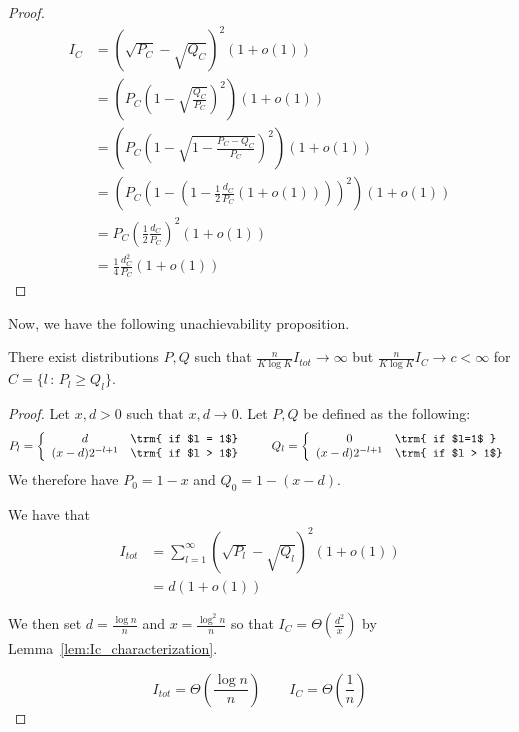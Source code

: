 \documentclass{article}
\begin{document}
\begin{proof}

\begin{align*}
I_C &= (\sqrt{P_C} - \sqrt{Q_C} )^2 (1 + o(1)) \\
 &= \left( P_C (1 - \sqrt{\frac{Q_C}{P_C}})^2  \right) (1 + o(1)) \\
&= \left( P_C \left( 1 - \sqrt{ 1 - \frac{P_C - Q_C}{P_C}}\right)^2 
         \right) (1+o(1)) \\
&= \left( 
    P_C \left( 1 - (1 - \frac{1}{2} \frac{d_C}{P_C} (1+o(1)) ) \right)^2 
    \right) (1+o(1)) \\
&= P_C \left( \frac{1}{2} \frac{d_C}{P_C} \right)^2 (1 + o(1)) \\
&= \frac{1}{4} \frac{d_C^2}{P_C} (1 + o(1)) 
\end{align*}

\end{proof}

Now, we have the following unachievability proposition.
\begin{proposition}
There exist distributions $P,Q$ such that $\frac{n}{K \log K} I_{tot} \rightarrow \infty$ but $\frac{n}{K \log K} I_C \rightarrow c < \infty$ for $C = \{ l \,:\, P_l \geq Q_l \}$.
\end{proposition}

\begin{proof} Let $x, d > 0$ such that $x, d \rightarrow 0$. 
Let $P, Q$ be defined as the following:
\begin{align*}
P_l = \left\{ \begin{array}{cl} 
  d & \trm{ if $l = 1$} \\
  (x - d) 2^{-l+1} & \trm{ if $l > 1$} 
 \end{array} \right. 
\qquad
Q_l = \left\{ \begin{array}{cl} 
  0 & \trm{ if $l=1$ } \\
  (x - d) 2^{-l+1} & \trm{ if $l > 1$} 
\end{array} \right.
\end{align*}
We therefore have $P_0 = 1 - x$ and $Q_0 = 1 - (x - d)$. 

We have that
\begin{align*} 
I_{tot} &= \sum_{l=1}^\infty (\sqrt{P_l} - \sqrt{Q_l})^2 (1 + o(1)) \\
 &= d (1 + o(1)) 
\end{align*}

We then set $d = \frac{\log n}{n}$ and $x = \frac{\log^2 n}{n}$ so that $I_C = \Theta( \frac{ d^2}{x})$ by Lemma~\ref{lem:Ic_characterization}.

\[
I_{tot} = \Theta \left( \frac{\log n}{n} \right) \qquad I_C = \Theta \left( \frac{1}{n}\right) 
\]
\end{proof}
\end{document}
